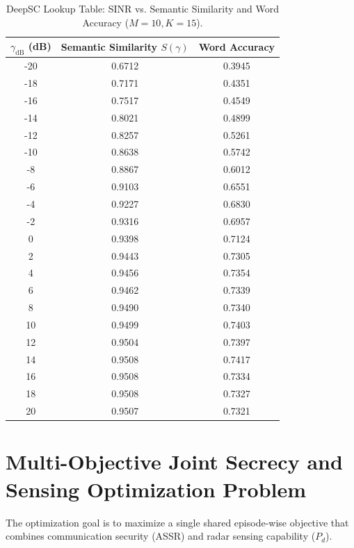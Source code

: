 \documentclass[journal,onecolumn]{IEEEtran}
\begin{document}
\begin{table}[H]
    \centering
    \caption{DeepSC Lookup Table: SINR vs. Semantic Similarity and Word Accuracy ($M=10, K=15$).}
    \label{tab:deepsc_lookup}
    \begin{tabular}{ccc}
        \toprule
        $\gamma_{\text{dB}}$ (dB) & Semantic Similarity $S(\gamma)$ & Word Accuracy \\
        \midrule
        -20 & 0.6712 & 0.3945 \\
        -18 & 0.7171 & 0.4351 \\
        -16 & 0.7517 & 0.4549 \\
        -14 & 0.8021 & 0.4899 \\
        -12 & 0.8257 & 0.5261 \\
        -10 & 0.8638 & 0.5742 \\
        -8  & 0.8867 & 0.6012 \\
        -6  & 0.9103 & 0.6551 \\
        -4  & 0.9227 & 0.6830 \\
        -2  & 0.9316 & 0.6957 \\
        0   & 0.9398 & 0.7124 \\
        2   & 0.9443 & 0.7305 \\
        4   & 0.9456 & 0.7354 \\
        6   & 0.9462 & 0.7339 \\
        8   & 0.9490 & 0.7340 \\
        10  & 0.9499 & 0.7403 \\
        12  & 0.9504 & 0.7397 \\
        14  & 0.9508 & 0.7417 \\
        16  & 0.9508 & 0.7334 \\
        18  & 0.9508 & 0.7327 \\
        20  & 0.9507 & 0.7321 \\
        \bottomrule
    \end{tabular}
\end{table}

\section{Multi-Objective Joint Secrecy and Sensing Optimization Problem}
The optimization goal is to maximize a single shared episode-wise objective that combines communication security (ASSR) and radar sensing capability ($P_d$).
\end{document}
